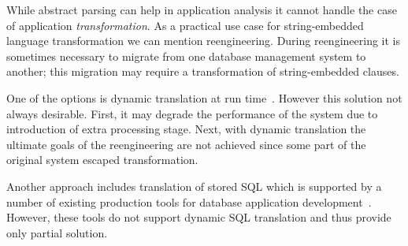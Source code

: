 While abstract parsing can help in application analysis it cannot handle the case of application
\emph{transformation}. As a practical use case for string-embedded language transformation we can mention
reengineering. During reengineering it is sometimes necessary to migrate from one database management 
system to another; this migration may require a transformation of string-embedded 
clauses. 

One of the options is dynamic translation at run time~\cite{OpenSystemsDBMS}. However this solution
not always desirable. First, it may degrade the performance of the system due to introduction of extra 
processing stage. Next, with dynamic translation the ultimate goals of the reengineering are not achieved 
since some part of the original system escaped transformation. 

Another approach includes translation of stored SQL which is supported by a number of existing production tools 
for database application development~\cite{PLSQL,SwissSQL,SQLWays}. However, these tools do not support 
dynamic SQL translation and thus provide only partial solution. 






